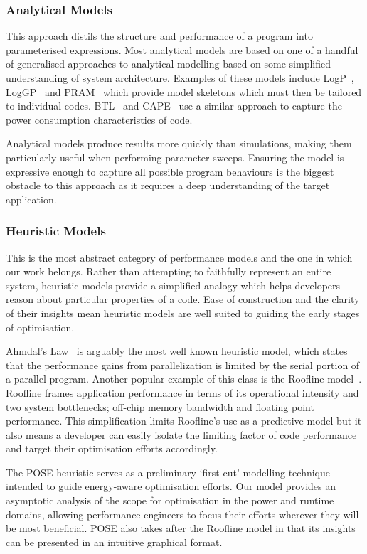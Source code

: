 \subsubsection{Analytical Models} This approach distils the structure and performance of a program into parameterised expressions.
Most analytical models are based on one of a handful of generalised approaches to analytical modelling based on some simplified understanding of system architecture.
Examples of these models include LogP~\cite{culler:1993aa}, LogGP~\cite{alexandrov:1997aa} and PRAM~\cite{karp:1991aa} which provide model skeletons which must then be tailored to individual codes.
BTL~\cite{manousakis:2012aa} and CAPE~\cite{kamble:1997aa} use a similar approach to capture the power consumption characteristics of code. 

Analytical models produce results more quickly than simulations, making them particularly useful when performing parameter sweeps.
Ensuring the model is expressive enough to capture all possible program behaviours is the biggest obstacle to this approach as it requires a deep understanding of the target application.

\subsubsection{Heuristic Models}
This is the most abstract category of performance models and the one in which our work belongs.
Rather than attempting to faithfully represent an entire system, heuristic models provide a simplified analogy which helps developers reason about particular properties of a code.
Ease of construction and the clarity of their insights mean heuristic models are well suited to guiding the early stages of optimisation.

Ahmdal's Law~\cite{amdahl:1967aa} is arguably the most well known heuristic model, which states that the performance gains from parallelization is limited by the serial portion of a parallel program.
Another popular example of this class is the Roofline model~\cite{williams:2009aa}.
Roofline frames application performance in terms of its operational intensity and two system bottlenecks; off-chip memory bandwidth and floating point performance.
This simplification limits Roofline's use as a predictive model but it also means a developer can easily isolate the limiting factor of code performance and target their optimisation efforts accordingly.

The POSE heuristic serves as a preliminary `first cut' modelling technique intended to guide energy-aware optimisation efforts.
Our model provides an asymptotic analysis of the scope for optimisation in the power and runtime domains, allowing performance engineers to focus their efforts wherever they will be most beneficial.
POSE also takes after the Roofline model in that its insights can be presented in an intuitive graphical format.
